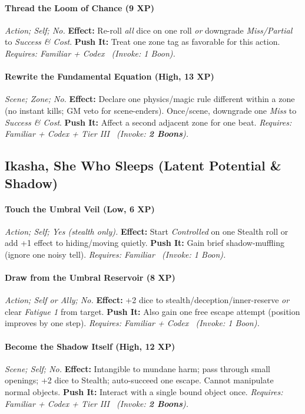 \documentclass[12pt,twoside]{book}
\begin{document}
\paragraph{Thread the Loom of Chance (9 XP)} \emph{Action; Self; No.}
\textbf{Effect:} Re-roll \emph{all} dice on one roll \emph{or} downgrade \emph{Miss/Partial} to \emph{Success \& Cost}.
\textbf{Push It:} Treat one zone tag as favorable for this action.
\emph{Requires: Familiar + Codex \ (\textit{Invoke:} 1 Boon).}
\paragraph{Rewrite the Fundamental Equation (High, 13 XP)} \emph{Scene; Zone; No.}
\textbf{Effect:} Declare one physics/magic rule different within a zone (no instant kills; GM veto for scene-enders). Once/scene, downgrade one \emph{Miss} to \emph{Success \& Cost}.
\textbf{Push It:} Affect a second adjacent zone for one beat.
\emph{Requires: Familiar + Codex + Tier III \ (\textit{Invoke:} \textbf{2 Boons}).}

\subsection{Ikasha, She Who Sleeps (Latent Potential \& Shadow)}
\paragraph{Touch the Umbral Veil (Low, 6 XP)} \emph{Action; Self; Yes (stealth only).}
\textbf{Effect:} Start \emph{Controlled} on one Stealth roll or add +1 effect to hiding/moving quietly.
\textbf{Push It:} Gain brief shadow-muffling (ignore one noisy tell).
\emph{Requires: Familiar \ (\textit{Invoke:} 1 Boon).}
\paragraph{Draw from the Umbral Reservoir (8 XP)} \emph{Action; Self or Ally; No.}
\textbf{Effect:} +2 dice to stealth/deception/inner-reserve \emph{or} clear \emph{Fatigue 1} from target.
\textbf{Push It:} Also gain one free escape attempt (position improves by one step).
\emph{Requires: Familiar + Codex \ (\textit{Invoke:} 1 Boon).}
\paragraph{Become the Shadow Itself (High, 12 XP)} \emph{Scene; Self; No.}
\textbf{Effect:} Intangible to mundane harm; pass through small openings; +2 dice to Stealth; auto-succeed one escape. Cannot manipulate normal objects.
\textbf{Push It:} Interact with a single bound object once.
\emph{Requires: Familiar + Codex + Tier III \ (\textit{Invoke:} \textbf{2 Boons}).}
\end{document}
